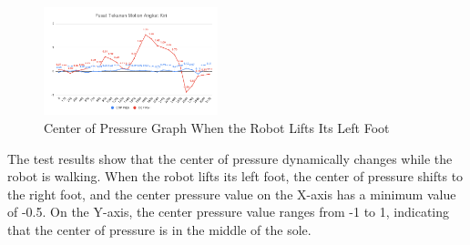 \begin{enumerate}[label=\Alph*.]
        \begin{figure}[h!]
            \centering
            \includegraphics[width=0.45\textwidth]{gambar/Angkat_Kiri.png}
            \caption{Center of Pressure Graph When the Robot Lifts Its Left Foot}
            \label{fig:pusat_tekanan_kiri}
        \end{figure}

        \hspace*{1em} The test results show that the center of pressure dynamically changes while the robot is walking. When the robot lifts its left foot, the center of pressure shifts to the right foot, and the center pressure value on the X-axis has a minimum value of -0.5. On the Y-axis, the center pressure value ranges from -1 to 1, indicating that the center of pressure is in the middle of the sole.
\end{enumerate}
